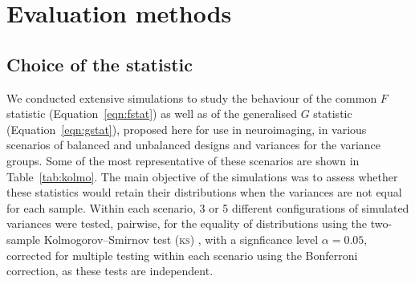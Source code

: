 \section{Evaluation methods}

\subsection{Choice of the statistic}
\label{sec:perm:method_statistic}

We conducted extensive simulations to study the behaviour of the common $F$ statistic (Equation~\ref{eqn:fstat}) as well as of the generalised $G$ statistic (Equation~\ref{eqn:gstat}), proposed here for use in neuroimaging, in various scenarios of balanced and unbalanced designs and variances for the variance groups. Some of the most representative of these scenarios are shown in Table~\ref{tab:kolmo}. The main objective of the simulations was to assess whether these statistics would retain their distributions when the variances are not equal for each sample. Within each scenario, 3 or 5 different configurations of simulated variances were tested, pairwise, for the equality of distributions using the two-sample Kolmogorov--Smirnov test (\textsc{ks}) \citep{Press1992}, with a signficance level $\alpha = 0.05$, corrected for multiple testing within each scenario using the Bonferroni correction, as these tests are independent.

